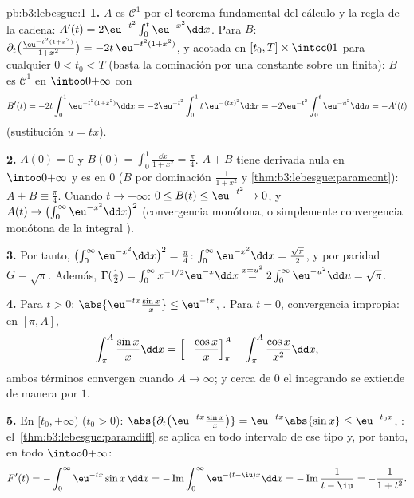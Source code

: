 \begin{solution}{pb:b3:lebesgue:1}
\textbf{1.} $A$ es $\mathcal C^1$ por el teorema fundamental del cálculo
y la regla de la cadena: $A'(t) =
2\eu^{-t^2}\int_0^t\eu^{-x^2}\dd x$. Para $B$:
$\partial_t\bigl(\frac{\eu^{-t^2(1+x^2)}}{1+x^2}\bigr) =
-2t\,\eu^{-t^2(1+x^2)}$,  y
acotada en $[t_0, T]
\times \intcc01$ para cualquier $0 < t_0 < T$ (basta la dominación por
una constante sobre un  finita): $B$ es $\mathcal C^1$ en $\intoo0{+\infty}$ con
\[
B'(t) = -2t\int_0^1 \eu^{-t^2(1+x^2)}\dd x
= -2\eu^{-t^2}\int_0^1 t\,\eu^{-(tx)^2}\dd x
= -2\eu^{-t^2}\int_0^t\eu^{-u^2}\dd u = -A'(t)
\]
(sustitución $u = tx$).

\textbf{2.} $A(0) = 0$ y $B(0) = \int_0^1\frac{\dd x}{1+x^2}
= \frac\pi4$. $A + B$ tiene derivada nula en $\intoo0{+\infty}$ y es
 en $0$ ($B$ por dominación
$\frac1{1+x^2}$ y
\cref{thm:b3:lebesgue:paramcont}): $A + B \equiv \frac\pi4$.
Cuando $t\to+\infty$: $0 \leq B(t) \leq \eu^{-t^2} \to 0$, y
$A(t) \to \bigl(\int_0^\infty\eu^{-x^2}\dd x\bigr)^2$ (convergencia
monótona, o simplemente convergencia monótona de la integral ).

\textbf{3.} Por tanto, $\bigl(\int_0^\infty\eu^{-x^2}\dd x\bigr)^2
= \frac\pi4$: $\int_0^\infty\eu^{-x^2}\dd x =
\frac{\sqrt\pi}2$, y por paridad $G = \sqrt\pi$. Además,
$\Gamma(\frac12) = \int_0^\infty x^{-1/2}\eu^{-x}\dd x
\overset{x = u^2}{=} 2\int_0^\infty\eu^{-u^2}\dd u =
\sqrt\pi$.

\textbf{4.} Para $t > 0$: $\abs{\eu^{-tx}\frac{\sin x}x} \leq
\eu^{-tx}$, . Para $t = 0$,
convergencia impropia: en
$[\pi, A]$,
\[
\int_\pi^A\frac{\sin x}x\dd x
= \Bigl[-\frac{\cos x}x\Bigr]_\pi^A -
\int_\pi^A\frac{\cos x}{x^2}\dd x,
\]
ambos términos convergen cuando $A \to \infty$; y cerca de $0$ el
integrando se extiende de manera
 por $1$.

\textbf{5.} En $[t_0, +\infty)$ ($t_0 > 0$):
$\abs{\partial_t\bigl(\eu^{-tx}\tfrac{\sin x}x\bigr)} =
\eu^{-tx}\abs{\sin x} \leq \eu^{-t_0x}$,
:
el~\cref{thm:b3:lebesgue:paramdiff} se aplica en todo intervalo de ese
tipo y, por tanto, en todo $\intoo0{+\infty}$:
\[
F'(t) = -\int_0^\infty\eu^{-tx}\sin x\,\dd x
= -\operatorname{Im}\int_0^\infty\eu^{-(t - \iu)x}\dd x
= -\operatorname{Im}\frac{1}{t - \iu} = -\frac{1}{1 + t^2}.
\]


\end{solution}
